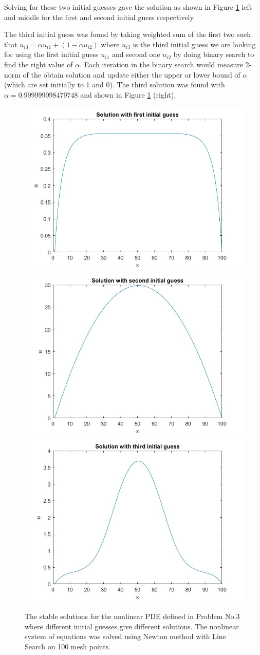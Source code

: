 Solving for these two initial guesses gave the solution as shown in Figure \ref{fig:prob3} left and middle for the first and second initial guess respectively. 

The third initial guess was found by taking weighted sum of the first two such that 
$u_{i3} = \alpha u_{i1} + (1-\alpha u_{i2})$ where $u_{i3}$ is the third initial guess we are looking for using the first initial guess $u_{i1}$ and second one $u_{i2}$ by doing binary search to find the right value of $\alpha$. Each iteration in the binary search would measure 2-norm of the obtain solution and update either the upper or lower bound of $\alpha$ (which are set initially to 1 and 0). The third solution was found with $\alpha = 0.999999098479748$ and shown in Figure \ref{fig:prob3} (right). 
 

\begin{figure}[H]
 \centering  
   {\includegraphics[width=0.32\linewidth]{code/p3_1.jpg}}   
   {\includegraphics[width=0.32\linewidth]{code/p3_2.jpg}}
   {\includegraphics[width=0.32\linewidth]{code/p3_3.jpg}}
  \caption{The stable solutions for the nonlinear PDE defined in Problem No.3 where different initial guesses give different solutions. The nonlinear system of equations was solved using Newton method with Line Search on 100 mesh points.}
   \label{fig:prob3}
\end{figure} 